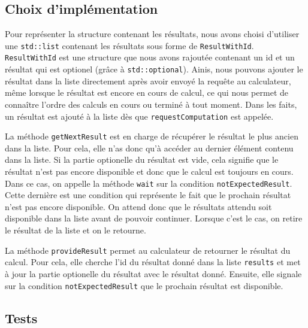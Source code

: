 \documentclass{article}
\begin{document}
\subsection{Choix d'implémentation}
Pour représenter la structure contenant les résultats, nous avons choisi d'utiliser une \texttt{std::list} contenant les
résultats sous forme de \texttt{ResultWithId}. \texttt{ResultWithId} est une structure que nous avons rajoutée
contenant un id et un résultat qui est optionel (grâce à \texttt{std::optional}). Ainis, nous pouvons ajouter le
résultat dans la liste directement après avoir envoyé la requête au calculateur, même lorsque le résultat est encore
en cours de calcul, ce qui nous permet de connaître l'ordre des calculs en cours ou terminé à tout moment. Dans les
faits, un résultat est ajouté à la liste dès que \texttt{requestComputation} est appelée.

La méthode \texttt{getNextResult} est en charge de récupérer le résultat le plus ancien dans la liste. Pour cela, elle
n'as donc qu'à accéder au dernier élément contenu dans la liste. Si la partie optionelle du résultat est vide, cela
signifie que le résultat n'est pas encore disponible et donc que le calcul est toujours en cours. Dans ce cas, on
appelle la méthode \texttt{wait} sur la condition \texttt{notExpectedResult}. Cette dernière est une condition qui
représente le fait que le prochain résultat n'est pas encore disponible. On attend donc que le résultats attendu
soit disponible dans la liste avant de pouvoir continuer. Lorsque c'est le cas, on retire le résultat de la liste et
on le retourne.

La méthode \texttt{provideResult} permet au calculateur de retourner le résultat du calcul. Pour cela, elle cherche
l'id du résultat donné dans la liste \texttt{results} et met à jour la partie optionelle du résultat avec le résultat
donné. Ensuite, elle signale sur la condition \texttt{notExpectedResult} que le prochain résultat est disponible.


\subsection{Tests}
\end{document}
